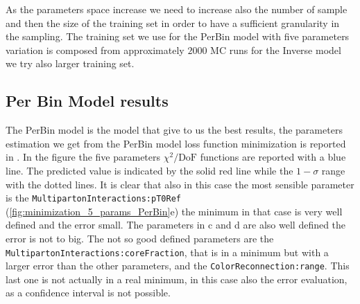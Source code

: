 \noindent As the parameters space increase we need to increase also the number of sample and then the size of the training set in order to have a sufficient granularity in the sampling. 
The training set we use for the PerBin model with five parameters variation is composed from approximately $2000$ MC runs for the Inverse model we try also larger training set. 

\subsection{Per Bin Model results}

The PerBin model is the model that give to us the best results, the parameters estimation we get from the PerBin model loss function minimization is reported in . In the figure the five parameters $\chi^2/\mathrm{DoF}$ functions are reported with a blue line. The predicted value is indicated by the solid red line while the $1-\sigma$ range with the dotted lines. 
It is clear that also in this case the most sensible parameter is the \texttt{MultipartonInteractions:pT0Ref} (\ref{fig:minimization_5_params_PerBin}e) the minimum in that case is very well defined and the error small. The parameters in c and d are also well defined the error is not to big. The not so good defined parameters are  the \texttt{MultipartonInteractions:coreFraction}, that is in a minimum but with a larger error than the other parameters, and the \texttt{ColorReconnection:range}. This last one is not actually in a real minimum, in this case also the error evaluation, as a confidence interval is not possible. 
